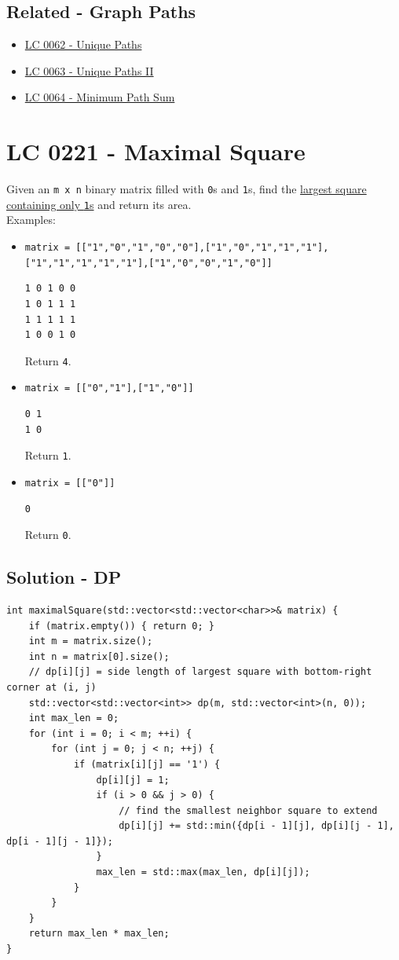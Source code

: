 \subsection*{Related - Graph Paths}
\begin{itemize}
	\item \hyperref[lc0062]{LC 0062 - Unique Paths}
	\item \hyperref[lc0063]{LC 0063 - Unique Paths II}
	\item \hyperref[lc0064]{LC 0064 - Minimum Path Sum}
\end{itemize}

\section{LC 0221 - Maximal Square}
Given an {\colorbox{CodeBackground}{\lstinline|m x n|}} binary matrix filled with {\colorbox{CodeBackground}{\lstinline|0|}}s and {\colorbox{CodeBackground}{\lstinline|1|}}s, find the \ul{largest square containing only {\colorbox{CodeBackground}{\lstinline|1|}}s} and return its area.\\

Examples:
\begin{itemize}
\item {\colorbox{CodeBackground}{\lstinline|matrix = [["1","0","1","0","0"],["1","0","1","1","1"],["1","1","1","1","1"],["1","0","0","1","0"]]|}}
\begin{lstlisting}
1 0 1 0 0
1 0 1 1 1
1 1 1 1 1
1 0 0 1 0
\end{lstlisting}
Return {\colorbox{CodeBackground}{\lstinline|4|}}.
\item {\colorbox{CodeBackground}{\lstinline|matrix = [["0","1"],["1","0"]]|}}
\begin{lstlisting}
0 1
1 0
\end{lstlisting}
Return {\colorbox{CodeBackground}{\lstinline|1|}}.
\item {\colorbox{CodeBackground}{\lstinline|matrix = [["0"]]|}}
\begin{lstlisting}
0
\end{lstlisting}
Return {\colorbox{CodeBackground}{\lstinline|0|}}.
\end{itemize}

\subsection*{Solution - DP}
\begin{lstlisting}
int maximalSquare(std::vector<std::vector<char>>& matrix) {
	if (matrix.empty()) { return 0; }
	int m = matrix.size();
	int n = matrix[0].size();
	// dp[i][j] = side length of largest square with bottom-right corner at (i, j)
	std::vector<std::vector<int>> dp(m, std::vector<int>(n, 0));
	int max_len = 0;
	for (int i = 0; i < m; ++i) {
		for (int j = 0; j < n; ++j) {
			if (matrix[i][j] == '1') {
				dp[i][j] = 1;
				if (i > 0 && j > 0) {
					// find the smallest neighbor square to extend
					dp[i][j] += std::min({dp[i - 1][j], dp[i][j - 1], dp[i - 1][j - 1]});
				}
				max_len = std::max(max_len, dp[i][j]);
			}
		}
	}
	return max_len * max_len;
}
\end{lstlisting}


